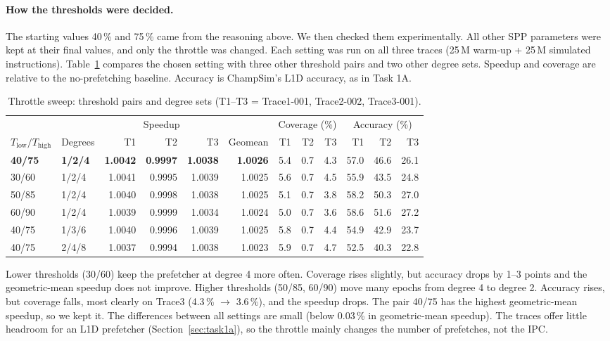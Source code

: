 \documentclass[11pt,a4paper]{article}
\begin{document}
\paragraph{How the thresholds were decided.}
The starting values 40\,\% and 75\,\% came from the reasoning above. We then checked them
experimentally. All other SPP parameters were kept at their final values, and only the
throttle was changed. Each setting was run on all three traces (25\,M warm-up + 25\,M simulated
instructions). Table~\ref{tab:spp-thr-sweep} compares the chosen setting with three other threshold
pairs and two other degree sets. Speedup and coverage are relative to the no-prefetching baseline.
Accuracy is ChampSim's L1D accuracy, as in Task 1A.

\begin{table}[H]
    \centering
    \small
    \setlength{\tabcolsep}{4pt}
    \begin{tabular}{ll rrr r rrr rrr}
        \toprule
        & & \multicolumn{3}{c}{Speedup} & & \multicolumn{3}{c}{Coverage (\%)} & \multicolumn{3}{c}{Accuracy (\%)} \\
        \cmidrule(lr){3-5}\cmidrule(lr){7-9}\cmidrule(lr){10-12}
        $T_{\text{low}}/T_{\text{high}}$ & Degrees & T1 & T2 & T3 & Geomean & T1 & T2 & T3 & T1 & T2 & T3 \\
        \midrule
        \textbf{40/75} & \textbf{1/2/4} & \textbf{1.0042} & \textbf{0.9997} & \textbf{1.0038} & \textbf{1.0026} & 5.4 & 0.7 & 4.3 & 57.0 & 46.6 & 26.1 \\
        30/60 & 1/2/4 & 1.0041 & 0.9995 & 1.0039 & 1.0025 & 5.6 & 0.7 & 4.5 & 55.9 & 43.5 & 24.8 \\
        50/85 & 1/2/4 & 1.0040 & 0.9998 & 1.0038 & 1.0025 & 5.1 & 0.7 & 3.8 & 58.2 & 50.3 & 27.0 \\
        60/90 & 1/2/4 & 1.0039 & 0.9999 & 1.0034 & 1.0024 & 5.0 & 0.7 & 3.6 & 58.6 & 51.6 & 27.2 \\
        \midrule
        40/75 & 1/3/6 & 1.0040 & 0.9996 & 1.0039 & 1.0025 & 5.8 & 0.7 & 4.4 & 54.9 & 42.9 & 23.7 \\
        40/75 & 2/4/8 & 1.0037 & 0.9994 & 1.0038 & 1.0023 & 5.9 & 0.7 & 4.7 & 52.5 & 40.3 & 22.8 \\
        \bottomrule
    \end{tabular}
    \caption{Throttle sweep: threshold pairs and degree sets (T1--T3 = Trace1-001, Trace2-002, Trace3-001).}
    \label{tab:spp-thr-sweep}
\end{table}

Lower thresholds (30/60) keep the prefetcher at degree 4 more often. Coverage rises slightly, but
accuracy drops by 1--3 points and the geometric-mean speedup does not improve. Higher thresholds
(50/85, 60/90) move many epochs from degree 4 to degree 2. Accuracy rises, but coverage falls,
most clearly on Trace3 (4.3\,\% $\to$ 3.6\,\%), and the speedup drops. The pair 40/75 has the
highest geometric-mean speedup, so we kept it. The differences between all settings are small
(below 0.03\,\% in geometric-mean speedup). The traces offer little headroom for an L1D prefetcher
(Section~\ref{sec:task1a}), so the throttle mainly changes the number of prefetches, not the IPC.
\end{document}
